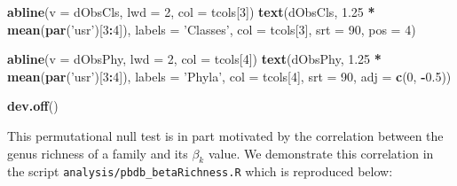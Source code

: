 \documentclass[]{article}
\newenvironment{Shaded}{\begin{snugshade}}{\end{snugshade}}
\newcommand{\KeywordTok}[1]{\textcolor[rgb]{0.13,0.29,0.53}{\textbf{#1}}}
\newcommand{\DataTypeTok}[1]{\textcolor[rgb]{0.13,0.29,0.53}{#1}}
\newcommand{\DecValTok}[1]{\textcolor[rgb]{0.00,0.00,0.81}{#1}}
\newcommand{\FloatTok}[1]{\textcolor[rgb]{0.00,0.00,0.81}{#1}}
\newcommand{\StringTok}[1]{\textcolor[rgb]{0.31,0.60,0.02}{#1}}
\newcommand{\OperatorTok}[1]{\textcolor[rgb]{0.81,0.36,0.00}{\textbf{#1}}}
\newcommand{\NormalTok}[1]{#1}
\begin{document}
\begin{Shaded}
\begin{Highlighting}[]
\KeywordTok{abline}\NormalTok{(}\DataTypeTok{v =}\NormalTok{ dObsCls, }\DataTypeTok{lwd =} \DecValTok{2}\NormalTok{, }\DataTypeTok{col =}\NormalTok{ tcols[}\DecValTok{3}\NormalTok{])}
\KeywordTok{text}\NormalTok{(dObsCls, }\FloatTok{1.25} \OperatorTok{*}\StringTok{ }\KeywordTok{mean}\NormalTok{(}\KeywordTok{par}\NormalTok{(}\StringTok{'usr'}\NormalTok{)[}\DecValTok{3}\OperatorTok{:}\DecValTok{4}\NormalTok{]), }\DataTypeTok{labels =} \StringTok{'Classes'}\NormalTok{, }\DataTypeTok{col =}\NormalTok{ tcols[}\DecValTok{3}\NormalTok{],}
     \DataTypeTok{srt =} \DecValTok{90}\NormalTok{, }\DataTypeTok{pos =} \DecValTok{4}\NormalTok{)}

\KeywordTok{abline}\NormalTok{(}\DataTypeTok{v =}\NormalTok{ dObsPhy, }\DataTypeTok{lwd =} \DecValTok{2}\NormalTok{, }\DataTypeTok{col =}\NormalTok{ tcols[}\DecValTok{4}\NormalTok{])}
\KeywordTok{text}\NormalTok{(dObsPhy, }\FloatTok{1.25} \OperatorTok{*}\StringTok{ }\KeywordTok{mean}\NormalTok{(}\KeywordTok{par}\NormalTok{(}\StringTok{'usr'}\NormalTok{)[}\DecValTok{3}\OperatorTok{:}\DecValTok{4}\NormalTok{]), }\DataTypeTok{labels =} \StringTok{'Phyla'}\NormalTok{, }\DataTypeTok{col =}\NormalTok{ tcols[}\DecValTok{4}\NormalTok{],}
     \DataTypeTok{srt =} \DecValTok{90}\NormalTok{, }\DataTypeTok{adj =} \KeywordTok{c}\NormalTok{(}\DecValTok{0}\NormalTok{, }\OperatorTok{-}\FloatTok{0.5}\NormalTok{))}

\KeywordTok{dev.off}\NormalTok{()}
\end{Highlighting}
\end{Shaded}

This permutational null test is in part motivated by the correlation
between the genus richness of a family and its \(\beta_k\) value. We
demonstrate this correlation in the script
\texttt{analysis/pbdb\_betaRichness.R} which is reproduced below:
\end{document}
